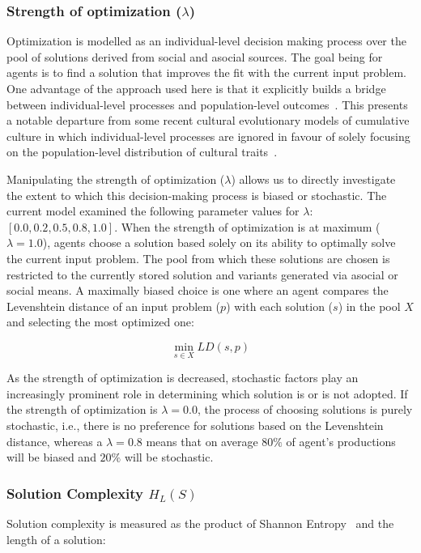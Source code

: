 \documentclass{article}
\begin{document}
\subsubsection{Strength of optimization ($\lambda$)}
Optimization is modelled as an individual-level decision making process over the pool of solutions derived from social and asocial sources. The goal being for agents is to find a solution that improves the fit with the current input problem. One advantage of the approach used here is that it explicitly builds a bridge between individual-level processes and population-level outcomes~\cite{derex2018divide}. This presents a notable departure from some recent cultural evolutionary models of cumulative culture in which individual-level processes are ignored in favour of solely focusing on the population-level distribution of cultural traits~\cite{enquist2011modelling,lewis2012transmission}.

Manipulating the strength of optimization ($\lambda$) allows us to directly investigate the extent to which this decision-making process is biased or stochastic. The current model examined the following parameter values for $\lambda$: $[0.0,0.2,0.5,0.8,1.0]$. When the strength of optimization is at maximum ($\lambda=1.0$), agents choose a solution based solely on its ability to optimally solve the current input problem. The pool from which these solutions are chosen is restricted to the currently stored solution and variants generated via asocial or social means. A maximally biased choice is one where an agent compares the Levenshtein distance of an input problem ($p$) with each solution ($s$) in the pool $X$ and selecting the most optimized one:

$$\min\limits_{s \in X} LD(s,p)$$

As the strength of optimization is decreased, stochastic factors play an increasingly prominent role in determining which solution is or is not adopted. If the strength of optimization is $\lambda=0.0$, the process of choosing solutions is purely stochastic, i.e., there is no preference for solutions based on the Levenshtein distance, whereas a $\lambda=0.8$ means that on average $80\%$ of agent's productions will be biased and $20\%$ will be stochastic. 

\subsubsection{Solution Complexity $H_{L}(S)$}
Solution complexity is measured as the product of Shannon Entropy~\cite{shannon1949mathematical,cover2012elements} and the length of a solution: 
\end{document}
